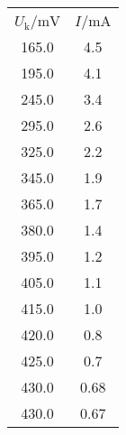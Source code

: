 \begin{table}
\begin{tabular}{cc}
$U_\text{k}$/$\si{\milli\volt}$ & $I$/$\si{\milli\ampere}$ \\
165.0 & 4.5 \\
195.0 & 4.1 \\
245.0 & 3.4 \\
295.0 & 2.6 \\
325.0 & 2.2 \\
345.0 & 1.9 \\
365.0 & 1.7 \\
380.0 & 1.4 \\
395.0 & 1.2 \\
405.0 & 1.1 \\
415.0 & 1.0 \\
420.0 & 0.8 \\
425.0 & 0.7 \\
430.0 & 0.68 \\
430.0 & 0.67 \\
\end{tabular}
\end{table}
